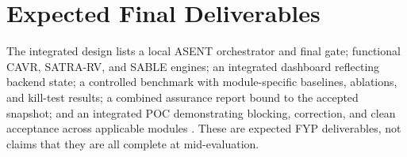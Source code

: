 \section{Expected Final Deliverables}
The integrated design lists a local ASENT orchestrator and final gate; functional CAVR, SATRA-RV, and SABLE engines; an integrated dashboard reflecting backend state; a controlled benchmark with module-specific baselines, ablations, and kill-test results; a combined assurance report bound to the accepted snapshot; and an integrated POC demonstrating blocking, correction, and clean acceptance across applicable modules \cite{asentIntegratedResearchDesign}. These are expected FYP deliverables, not claims that they are all complete at mid-evaluation.